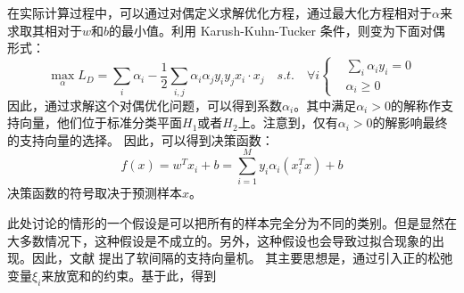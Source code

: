 在实际计算过程中，可以通过对偶定义求解优化方程，通过最大化方程相对于$\alpha$来求取其相对于$w$和$b$的最小值。利用 Karush-Kuhn-Tucker 条件，则变为下面对偶形式：
\begin{equation}
	\max \limits_{\alpha} L_D=\sum_i{\alpha_i}-\frac{1}{2}\sum_{i,j}\alpha_i\alpha_jy_iy_jx_i\cdot x_j \quad s.t. \quad \forall i
	\left\{
		\begin{aligned}
	   &\sum_i{\alpha_iy_i}=0  \\
	   &\alpha_i \geq 0
	   \end{aligned}
		\right.
\end{equation}
因此，通过求解这个对偶优化问题，可以得到系数$\alpha_i$。其中满足$\alpha_i>0$的解称作支持向量，他们位于标准分类平面$H_1$或者$H_2$上。注意到，仅有$\alpha_i>0$的解影响最终的支持向量的选择。
因此，可以得到决策函数：
\begin{equation}
	f(x)=w^Tx_i+b=\sum_{i=1}^My_i\alpha_i(x_i^Tx)+b
\end{equation}
决策函数的符号取决于预测样本$x$。

此处讨论的情形的一个假设是可以把所有的样本完全分为不同的类别。但是显然在大多数情况下，这种假设是不成立的。另外，这种假设也会导致过拟合现象的出现。因此，文献 \cite{cortes1995support} 提出了软间隔的支持向量机。
其主要思想是，通过引入正的松弛变量$\xi_i$来放宽和的约束。基于此，得到

